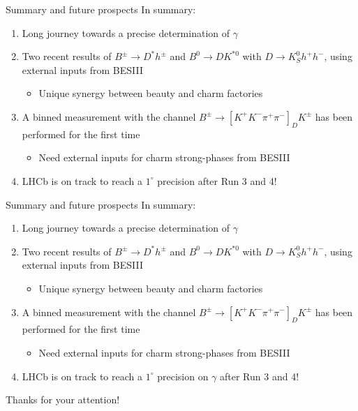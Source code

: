 \documentclass[dvipsnames]{beamer}
\begin{document}
\begin{frame}{Summary and future prospects}
  \vspace{0.0cm}
  {\Large In summary:}
  \vspace{0.3cm}
  \begin{enumerate}
    \setlength\itemsep{1.0em}
    \item{Long journey towards a precise determination of $\gamma$}
    \item{Two recent results of $B^\pm\to D^*h^\pm$ and $B^0\to DK^{*0}$ with $D\to K_S^0h^+h^-$, using external inputs from BESIII}
    \begin{itemize}
      \item{Unique synergy between beauty and charm factories}
    \end{itemize}
    \item{A binned measurement with the channel $B^\pm\to[K^+K^-\pi^+\pi^-]_DK^\pm$ has been performed for the first time}
    \begin{itemize}
      \item{Need external inputs for charm strong-phases from BESIII}
    \end{itemize}
    \item{LHCb is on track to reach a $1^\circ$ precision after Run 3 and 4!}
  \end{enumerate}
  \vspace{0.4cm}
  \begin{center}
    {\huge \phantom{Thanks for your attention!}}
  \end{center}
\end{frame}

\begin{frame}{Summary and future prospects}
  \vspace{0.0cm}
  {\Large In summary:}
  \vspace{0.3cm}
  \begin{enumerate}
    \setlength\itemsep{1.0em}
    \item{Long journey towards a precise determination of $\gamma$}
    \item{Two recent results of $B^\pm\to D^*h^\pm$ and $B^0\to DK^{*0}$ with $D\to K_S^0h^+h^-$, using external inputs from BESIII}
    \begin{itemize}
      \item{Unique synergy between beauty and charm factories}
    \end{itemize}
    \item{A binned measurement with the channel $B^\pm\to[K^+K^-\pi^+\pi^-]_DK^\pm$ has been performed for the first time}
    \begin{itemize}
      \item{Need external inputs for charm strong-phases from BESIII}
    \end{itemize}
    \item{LHCb is on track to reach a $1^\circ$ precision on $\gamma$ after Run 3 and 4!}
  \end{enumerate}
  \vspace{0.4cm}
  \begin{center}
    {\huge Thanks for your attention!}
  \end{center}
\end{frame}
\end{document}
